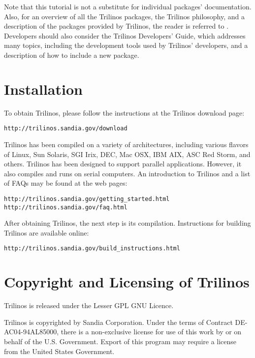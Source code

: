 Note that this tutorial is not a substitute for individual packages'
documentation. Also, for an overview of all the Trilinos packages, the
Trilinos philosophy, and a description of the packages provided by
Trilinos, the reader is referred to \cite{Trilinos-Overview}.
Developers should also consider the Trilinos Developers' Guide, which
addresses many topics, including the development tools used by Trilinos'
developers, and a description of how to include a new package.


\section{Installation}
\label{sec:installing}

To obtain Trilinos, please follow the instructions at the Trilinos download
page:
\begin{verbatim}
http://trilinos.sandia.gov/download
\end{verbatim}

Trilinos has been compiled on a variety of architectures, including
various flavors of Linux, Sun Solaris, SGI Irix, DEC, Mac OSX, IBM
AIX, ASC Red Storm, and others. Trilinos has been designed to support parallel
applications.  However, it also compiles and runs on serial computers.
An introduction to Trilinos and a list of FAQs
may be found at the web pages:
\begin{verbatim}
http://trilinos.sandia.gov/getting_started.html
http://trilinos.sandia.gov/faq.html
\end{verbatim}

After obtaining Trilinos, the next step is its compilation.  Instructions for
building Trilinos are available online:

\begin{verbatim}
http://trilinos.sandia.gov/build_instructions.html
\end{verbatim}


\section{Copyright and Licensing of Trilinos}
\label{sec:copyright}

Trilinos is released under the Lesser GPL GNU Licence.

Trilinos is copyrighted by Sandia Corporation. Under the terms of
Contract DE-AC04-94AL85000, there is a non-exclusive license for use of
this work by or on behalf of the U.S. Government.  Export of this
program may require a license from the United States Government.

